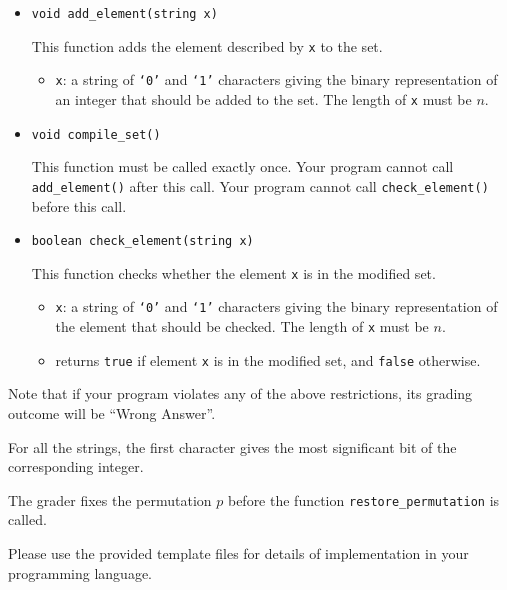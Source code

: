 \begin{itemize}
\item \texttt{void add\_element(string x)}

	This function adds the element described by \texttt{x} to the set.
\begin{itemize}
	\item \texttt{x}: a string of \texttt{`0'} and \texttt{`1'} characters giving the binary representation of an integer
    that should be added to the set. The length of \texttt{x} must be $n$.
\end{itemize}
\end{itemize}

\begin{itemize}
\item \texttt{void compile\_set()}

This function must be called exactly once. Your program cannot call \texttt{add\_element()} after this call.
    Your program cannot call \texttt{check\_element()} before this call.
\end{itemize}

\begin{itemize}
\item \texttt{boolean check\_element(string x)}

This function checks whether the element \texttt{x} is in the modified set.

\begin{itemize}
	\item \texttt{x}: a string of \texttt{`0'} and \texttt{`1'} characters giving the binary representation of
    the element that should be checked. The length of \texttt{x} must be $n$.
	\item returns \texttt{true} if element \texttt{x} is in the modified set, and \texttt{false} otherwise.
\end{itemize}
\end{itemize}

Note that if your program violates any of the above restrictions, its grading outcome will be ``Wrong Answer''.

For all the strings, the first character gives the most significant bit of the corresponding integer.

The grader fixes the permutation $p$ before the function \texttt{restore\_permutation} is called.

Please use the provided template files for details of implementation in your programming language.
